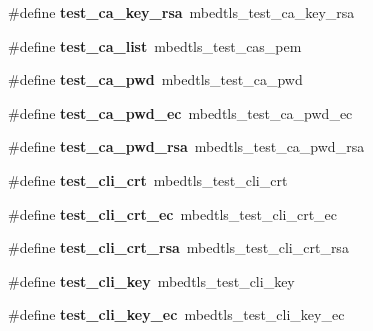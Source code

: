 \begin{DoxyCompactItemize}
\#define {\bfseries test\+\_\+ca\+\_\+key\+\_\+rsa}~mbedtls\+\_\+test\+\_\+ca\+\_\+key\+\_\+rsa
\item 
\mbox{\label{compat-1_83_8h_a82f8ca1ccaba0808eea48ee35b487cc0}} 
\#define {\bfseries test\+\_\+ca\+\_\+list}~mbedtls\+\_\+test\+\_\+cas\+\_\+pem
\item 
\mbox{\label{compat-1_83_8h_a310e94e860f4ee53eae07a09c63c25e1}} 
\#define {\bfseries test\+\_\+ca\+\_\+pwd}~mbedtls\+\_\+test\+\_\+ca\+\_\+pwd
\item 
\mbox{\label{compat-1_83_8h_a8d25397c1a1cfb17c3478edb86d1e3a2}} 
\#define {\bfseries test\+\_\+ca\+\_\+pwd\+\_\+ec}~mbedtls\+\_\+test\+\_\+ca\+\_\+pwd\+\_\+ec
\item 
\mbox{\label{compat-1_83_8h_a8d0c3af790464573376a6ee19e6e94af}} 
\#define {\bfseries test\+\_\+ca\+\_\+pwd\+\_\+rsa}~mbedtls\+\_\+test\+\_\+ca\+\_\+pwd\+\_\+rsa
\item 
\mbox{\label{compat-1_83_8h_a80dfb6b6d97b2fce655c08ed757e69d7}} 
\#define {\bfseries test\+\_\+cli\+\_\+crt}~mbedtls\+\_\+test\+\_\+cli\+\_\+crt
\item 
\mbox{\label{compat-1_83_8h_abd93406721b33172c5acd078ddebb38d}} 
\#define {\bfseries test\+\_\+cli\+\_\+crt\+\_\+ec}~mbedtls\+\_\+test\+\_\+cli\+\_\+crt\+\_\+ec
\item 
\mbox{\label{compat-1_83_8h_a4d49c3e2e33a6a9c5333822e8ee7b6a8}} 
\#define {\bfseries test\+\_\+cli\+\_\+crt\+\_\+rsa}~mbedtls\+\_\+test\+\_\+cli\+\_\+crt\+\_\+rsa
\item 
\mbox{\label{compat-1_83_8h_aeca2efecd064b1ae1315d7f3719666f1}} 
\#define {\bfseries test\+\_\+cli\+\_\+key}~mbedtls\+\_\+test\+\_\+cli\+\_\+key
\item 
\mbox{\label{compat-1_83_8h_a1a89baaeffc8f15033eb013f8a60b79c}} 
\#define {\bfseries test\+\_\+cli\+\_\+key\+\_\+ec}~mbedtls\+\_\+test\+\_\+cli\+\_\+key\+\_\+ec
\item 
\mbox{\label{compat-1_83_8h_ab66e6d2920e319a5b9b8d9882dfd7bef}} 

\end{DoxyCompactItemize}
